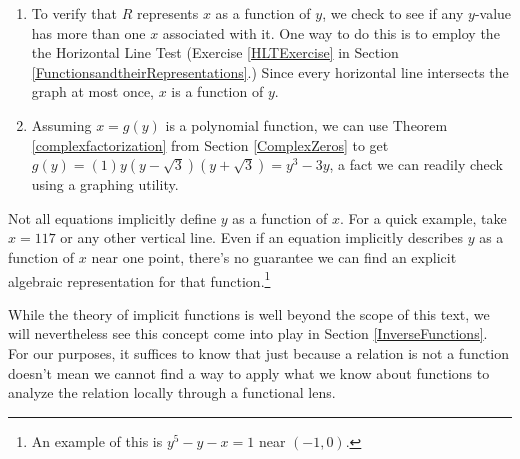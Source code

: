 \documentclass{ximera}
\begin{document}
\begin{example}
\begin{explanation}
\begin{enumerate}
\begin{image}
\end{image}



\item  To verify that $R$ represents $x$ as a function of $y$, we check to see if any $y$-value has more than one $x$ associated with it.  One way to do this is to employ the the Horizontal Line Test (Exercise \ref{HLTExercise} in Section \ref{FunctionsandtheirRepresentations}.)  Since every horizontal line intersects the graph at most once, $x$ is a function of $y$.  

\item Assuming $x = g(y)$ is a polynomial function, we can use Theorem \ref{complexfactorization} from Section \ref{ComplexZeros} to get $g(y) = (1)y(y-\sqrt{3})(y+\sqrt{3}) = y^3 - 3y$, a fact we can readily check using a graphing utility.

\end{enumerate}

\end{explanation}
\end{example}

Not all equations implicitly define $y$ as a function of $x$.  For a quick example,  take $x = 117$ or any other vertical line.  Even if an equation implicitly describes $y$ as a function of $x$ near one point, there's no guarantee we can find an explicit algebraic representation for that function.\footnote{An example of this is $y^5-y-x = 1$ near $(-1,0)$.}   

While the theory of implicit functions is well beyond the scope of this text, we will nevertheless see this concept come into play in Section \ref{InverseFunctions}.  For our purposes, it suffices to know that just because a relation is not a function doesn't mean we cannot find a way to apply what we know about functions to analyze the relation locally through a functional lens.  



\closegraphsfile
\end{document}
